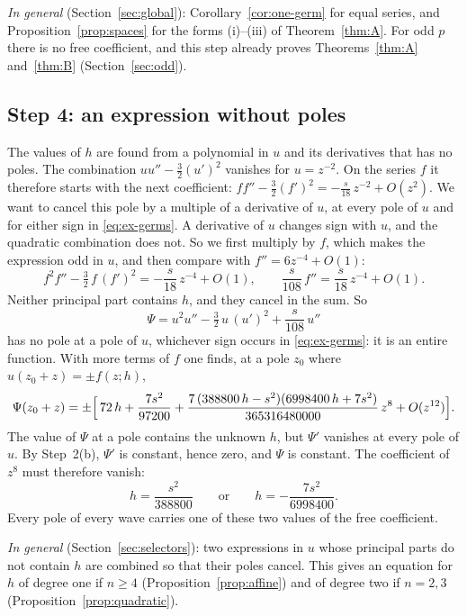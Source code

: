 \documentclass[11pt]{article}
\theoremstyle{definition}
\theoremstyle{remark}
\numberwithin{equation}{section}
\begin{document}
\emph{In general} (Section~\ref{sec:global}):
Corollary~\ref{cor:one-germ} for equal series, and
Proposition~\ref{prop:spaces} for the forms (i)--(iii) of
Theorem~\ref{thm:A}. For odd \(p\) there is no free coefficient, and
this step already proves Theorems~\ref{thm:A} and~\ref{thm:B}
(Section~\ref{sec:odd}).

\subsection{Step 4: an expression without poles}\label{sec:selector-example}

The values of \(h\) are found from a polynomial in \(u\) and its
derivatives that has no poles. The combination
\(uu''-\tfrac32(u')^2\) vanishes for \(u=z^{-2}\). On the series \(f\)
it therefore starts with the next coefficient:
\(ff''-\tfrac32(f')^2=-\tfrac{s}{18}\,z^{-2}+O(z^2)\). We want to
cancel this pole by a multiple of a derivative of \(u\), at every pole
of \(u\) and for either sign in \eqref{eq:ex-germs}. A derivative of
\(u\) changes sign with \(u\), and the quadratic combination does not.
So we first multiply by \(f\), which makes the expression odd in \(u\),
and then compare with \(f''=6z^{-4}+O(1)\):
\[
 f^2f''-\tfrac32\,f\,(f')^2=-\frac{s}{18}\,z^{-4}+O(1),\qquad
 \frac{s}{108}\,f''=\frac{s}{18}\,z^{-4}+O(1).
\]
Neither principal part contains \(h\), and they cancel in the sum. So
\[
 \Psi=u^2u''-\tfrac32\,u\,(u')^2+\frac{s}{108}\,u''
\]
has no pole at a pole of \(u\), whichever sign occurs in
\eqref{eq:ex-germs}: it is an entire function. With more terms of \(f\)
one finds, at a pole \(z_0\) where \(u(z_0+z)=\pm f(z;h)\),
\[
 \Psi(z_0+z)=\pm\Bigl[\,72\,h+\frac{7s^2}{97200}
 +\frac{7\,(388800\,h-s^2)(6998400\,h+7s^2)}{365316480000}\,z^{8}
 +O(z^{12})\Bigr].
\]
The value of \(\Psi\) at a pole contains the unknown \(h\), but
\(\Psi'\) vanishes at every pole of \(u\). By Step~2(b), \(\Psi'\) is
constant, hence zero, and \(\Psi\) is constant. The coefficient of
\(z^8\) must therefore vanish:
\[
 h=\frac{s^2}{388800}\qquad\text{or}\qquad h=-\frac{7s^2}{6998400}.
\]
Every pole of every wave carries one of these two values of the free
coefficient.

\emph{In general} (Section~\ref{sec:selectors}): two expressions in
\(u\) whose principal parts do not contain \(h\) are combined so that
their poles cancel. This gives an equation for \(h\) of degree one if
\(n\ge4\) (Proposition~\ref{prop:affine}) and of degree two if
\(n=2,3\) (Proposition~\ref{prop:quadratic}).
\end{document}
